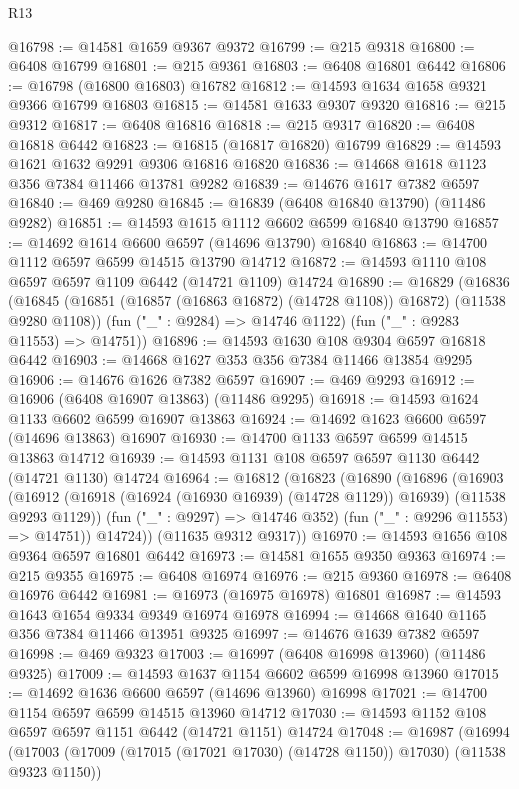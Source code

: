 \begin{lexlean}{R13}
\begin{coremodule}
@16798 := @14581 @1659 @9367 @9372
@16799 := @215 @9318
@16800 := @6408 @16799
@16801 := @215 @9361
@16803 := @6408 @16801 @6442
@16806 := @16798 (@16800 @16803) @16782
@16812 := @14593 @1634 @1658 @9321 @9366 @16799 @16803
@16815 := @14581 @1633 @9307 @9320
@16816 := @215 @9312
@16817 := @6408 @16816
@16818 := @215 @9317
@16820 := @6408 @16818 @6442
@16823 := @16815 (@16817 @16820) @16799
@16829 := @14593 @1621 @1632 @9291 @9306 @16816 @16820
@16836 := @14668 @1618 @1123 @356 @7384 @11466 @13781 @9282
@16839 := @14676 @1617 @7382 @6597
@16840 := @469 @9280
@16845 := @16839 (@6408 @16840 @13790) (@11486 @9282)
@16851 := @14593 @1615 @1112 @6602 @6599 @16840 @13790
@16857 := @14692 @1614 @6600 @6597 (@14696 @13790) @16840
@16863 := @14700 @1112 @6597 @6599 @14515 @13790 @14712
@16872 := @14593 @1110 @108 @6597 @6597 @1109 @6442 (@14721 @1109) @14724
@16890 := @16829
    (@16836
      (@16845 (@16851 (@16857 (@16863 @16872) (@14728 @1108)) @16872) (@11538 @9280 @1108))
      (fun ("_" : @9284) => @14746 @1122)
      (fun ("_" : @9283 @11553) => @14751))
@16896 := @14593 @1630 @108 @9304 @6597 @16818 @6442
@16903 := @14668 @1627 @353 @356 @7384 @11466 @13854 @9295
@16906 := @14676 @1626 @7382 @6597
@16907 := @469 @9293
@16912 := @16906 (@6408 @16907 @13863) (@11486 @9295)
@16918 := @14593 @1624 @1133 @6602 @6599 @16907 @13863
@16924 := @14692 @1623 @6600 @6597 (@14696 @13863) @16907
@16930 := @14700 @1133 @6597 @6599 @14515 @13863 @14712
@16939 := @14593 @1131 @108 @6597 @6597 @1130 @6442 (@14721 @1130) @14724
@16964 := @16812
    (@16823
      (@16890
        (@16896
          (@16903
            (@16912 (@16918 (@16924 (@16930 @16939) (@14728 @1129)) @16939) (@11538 @9293 @1129))
            (fun ("_" : @9297) => @14746 @352)
            (fun ("_" : @9296 @11553) => @14751))
          @14724))
      (@11635 @9312 @9317))
@16970 := @14593 @1656 @108 @9364 @6597 @16801 @6442
@16973 := @14581 @1655 @9350 @9363
@16974 := @215 @9355
@16975 := @6408 @16974
@16976 := @215 @9360
@16978 := @6408 @16976 @6442
@16981 := @16973 (@16975 @16978) @16801
@16987 := @14593 @1643 @1654 @9334 @9349 @16974 @16978
@16994 := @14668 @1640 @1165 @356 @7384 @11466 @13951 @9325
@16997 := @14676 @1639 @7382 @6597
@16998 := @469 @9323
@17003 := @16997 (@6408 @16998 @13960) (@11486 @9325)
@17009 := @14593 @1637 @1154 @6602 @6599 @16998 @13960
@17015 := @14692 @1636 @6600 @6597 (@14696 @13960) @16998
@17021 := @14700 @1154 @6597 @6599 @14515 @13960 @14712
@17030 := @14593 @1152 @108 @6597 @6597 @1151 @6442 (@14721 @1151) @14724
@17048 := @16987
    (@16994
      (@17003 (@17009 (@17015 (@17021 @17030) (@14728 @1150)) @17030) (@11538 @9323 @1150))

\end{coremodule}
\end{lexlean}
